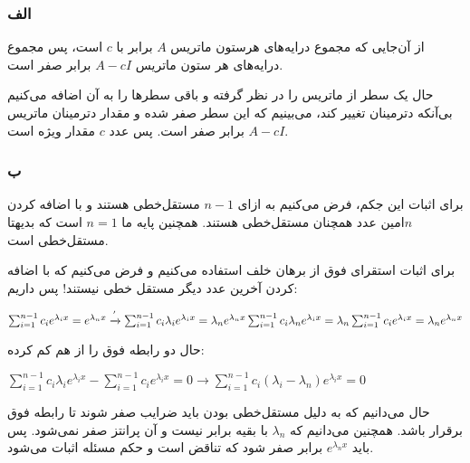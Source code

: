 \subsubsection*{الف}{
از آن‌جایی که مجموع درایه‌های هرستون ماتریس $A$ برابر با $c$ است، پس مجموع‌ درایه‌های هر ستون ماتریس $A-cI$ برابر صفر است.

حال یک سطر از ماتریس را در نظر گرفته و باقی سطرها را به آن اضافه می‌‌کنیم بی‌آنکه دترمینان تغییر کند، می‌بینیم که این سطر صفر شده و مقدار دترمینان ماتریس $A-cI$ برابر صفر است. پس عدد $c$ مقدار ویژه است.

}
\subsubsection*{ب}{
برای اثبات این جکم، فرض می‌کنیم به ازای $n-1$ مستقل‌خطی هستند و با اضافه کردن $n$امین عدد همچنان مستقل‌خطی هستند. همچنین پایه ما $n=1$ است که بدیهتا مستقل‌خطی است.

برای اثبات استقرای فوق از برهان خلف استفاده می‌کنیم و فرض می‌کنیم که با اضافه کردن آخرین عدد دیگر مستقل خطی نیستند!  پس داریم:

\setLTR
$
\sum_{i=1}^{n-1}c_ie^{\lambda_ix} = e^{\lambda_nx} \xrightarrow{'} \sum_{i=1}^{n-1}c_i\lambda_ie^{\lambda_ix} = \lambda_ne^{\lambda_nx} \\  \\
\sum_{i=1}^{n-1}c_i\lambda_ne^{\lambda_ix} = \lambda_n\sum_{i=1}^{n-1}c_ie^{\lambda_ix}=\lambda_ne^{\lambda_nx}
$
\setRTL

حال دو رابطه فوق را از هم کم کرده:

\setLTR
$
\sum_{i=1}^{n-1}c_i\lambda_ie^{\lambda_ix} - \sum_{i=1}^{n-1}c_ie^{\lambda_ix} = 0 \longrightarrow 
\sum_{i=1}^{n-1}c_i(\lambda_i-\lambda_n)e^{\lambda_ix} = 0
$
\setRTL

حال می‌دانیم که به دلیل مستقل‌خطی بودن باید ضرایب صفر شوند تا رابطه فوق برقرار باشد. همچنین می‌دانیم که $\lambda_n$ با بقیه برابر نیست و آن پرانتز صفر نمی‌شود. پس باید $e^{\lambda_nx}$ برابر صفر شود که تناقض است و حکم مسئله اثبات می‌شود.

}